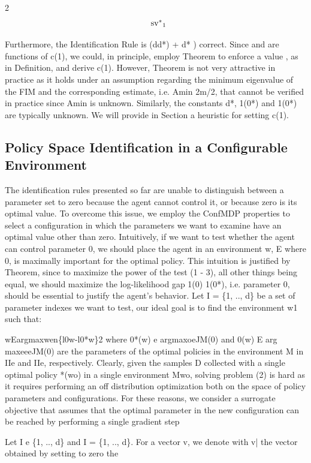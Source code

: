 \documentclass{article}
\begin{document}
\begin{paracol}{2}
\begin{equation}
\begin{array} { r l } & { \mathrm { s v ^ { * } } _ { 1 } ~ }\end{array}
\end{equation}


Furthermore, the Identification Rule is (dd*) + d* )
correct.
Since  and  are functions of c(1), we could, in principle, employ Theorem to enforce a value , as in Definition, and derive c(1). However, Theorem is not very attractive in practice as it holds under an assumption regarding the
minimum eigenvalue of the FIM and the corresponding estimate, i.e. Amin 2m/2, that cannot be verified in practice
since Amin is unknown. Similarly, the constants d*, 1(0*)
and 1(0*) are typically unknown. We will provide in Section
a heuristic for setting c(1).


\subsection*{Policy Space Identification in a Configurable
Environment}


The identification rules presented so far are unable to distinguish between a parameter set to zero because the agent
cannot control it, or because zero is its optimal value. To
overcome this issue, we employ the ConfMDP properties
to select a configuration in which the parameters we want to
examine have an optimal value other than zero. Intuitively, if
we want to test whether the agent can control parameter 0,
we should place the agent in an environment w, E  where
0, is maximally important for the optimal policy. This intuition is justified by Theorem, since to maximize the power
of the test (1 - 3), all other things being equal, we should
maximize the log-likelihood gap 1(0)  1(0*), i.e. parameter 0, should be essential to justify the agent's behavior. Let
I = \{1, .., d\} be a set of parameter indexes we want to test,
our ideal goal is to find the environment w1 such that:


wEargmaxwen\{l0w-l0*w\}2
where 0*(w) e argmaxoeJM(0) and 0(w) E
arg maxeeeJM(0) are the parameters of the optimal
policies in the environment M in IIe and IIe, respectively. Clearly, given the samples D collected with a single optimal policy *(wo) in a single environment Mwo,
solving problem (2) is hard as it requires performing an off
distribution optimization both on the space of policy parameters and configurations. For these reasons, we consider a
surrogate objective that assumes that the optimal parameter
in the new configuration can be reached by performing a single gradient step


Let I e \{1, .., d\} and I = \{1, .., d\}\I. For a vector v, we
denote with v| the vector obtained by setting to zero the

\end{paracol}
\end{document}
